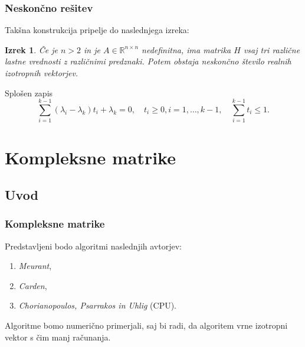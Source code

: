 \documentclass{beamer}
\newcommand{\R}{\mathbb R}
\newtheorem{izrek}{Izrek}
\begin{document}
\begin{frame}
\frametitle{Neskončno rešitev}
Takšna konstrukcija pripelje do naslednjega izreka:
\begin{izrek}
Če je $n>2$ in je $A\in\R^{n\times n}$ nedefinitna, ima matrika $H$ vsaj tri različne lastne vrednosti z različnimi predznaki. Potem obstaja neskončno število realnih izotropnih vektorjev.
\end{izrek}\pause
\begin{block}{Splošen zapis}
\begin{equation*}
\sum_{i=1}^{k-1} (\lambda_i -\lambda_k)t_i +\lambda_k =0, \quad t_i\ge0,  i=1, \dots,k-1, \quad \sum_{i=1}^{k-1}t_i \le1.
\end{equation*}
\end{block}
\end{frame}
\section{Kompleksne matrike} %
\subsection{Uvod}
\begin{frame}
\frametitle{Kompleksne matrike}
Predstavljeni bodo algoritmi naslednjih avtorjev:\medskip
\begin{enumerate}[1.]
\item \emph{Meurant},
\item \emph{Carden},
\item \emph{Chorianopoulos, Psarrakos in Uhlig} (CPU).
\end{enumerate}\medskip
Algoritme bomo numerično primerjali, saj bi radi, da algoritem vrne izotropni vektor s čim manj računanja.
\end{frame}
\end{document}
